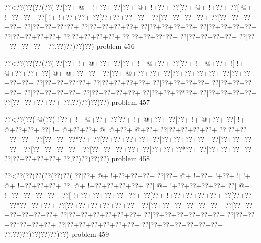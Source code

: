 \vbox{\vbox{\goo
\0??<\0??(\0??(\0??(\0??(
\0??[\0??+\- @+\- !+\0??+
\0??[\0??+\- @+\- !+\0??+
\0??[\0??+\- @+\- !+\0??+
\0??[\- @+\- !+\0??+\0??+
\0??[\- !+\- !+\0??+\0??+
\0??[\0??+\0??+\0??+\0??+
\0??[\0??+\0??+\0??+\0??+
\0??[\0??+\0??+\0??+\0??+
\0??[\0??+\0??+\0??*\0??+
\0??[\0??+\0??+\0??+\0??+
\0??[\0??+\0??+\0??+\0??+
\0??[\0??+\0??+\0??+\0??+
\0??[\0??+\0??+\0??+\0??+
\0??[\0??+\0??+\0??+\0??+
\0??[\0??+\0??+\0??*\0??+
\0??[\0??+\0??+\0??+\0??+
\0??[\0??+\0??+\0??+\0??+
\0??,\0??)\0??)\0??)\0??)
}
\hfil problem 456\hfil\break
}

\vbox{\vbox{\goo
\0??<\0??(\0??(\0??(\0??(
\0??[\0??+\- !+\- @+\0??+
\0??[\0??+\- !+\- @+\0??+
\0??[\0??+\- !+\- @+\0??+
\- ![\- !+\- @+\0??+\0??+
\0??[\- @+\- @+\0??+\0??+
\0??[\0??+\- @+\0??+\0??+
\0??[\0??+\0??+\0??+\0??+
\0??[\0??+\0??+\0??+\0??+
\0??[\0??+\0??+\0??*\0??+
\0??[\0??+\0??+\0??+\0??+
\0??[\0??+\0??+\0??+\0??+
\0??[\0??+\0??+\0??+\0??+
\0??[\0??+\0??+\0??+\0??+
\0??[\0??+\0??+\0??+\0??+
\0??[\0??+\0??+\0??*\0??+
\0??[\0??+\0??+\0??+\0??+
\0??[\0??+\0??+\0??+\0??+
\0??,\0??)\0??)\0??)\0??)
}
\hfil problem 457\hfil\break
}

\vbox{\vbox{\goo
\0??<\0??(\0??(\- @(\0??(
\- ![\0??+\- !+\- @+\0??+
\0??[\0??+\- !+\- @+\0??+
\0??[\0??+\- !+\- @+\0??+
\0??[\- !+\- @+\0??+\0??+
\0??[\- !+\- @+\0??+\0??+
\- @[\- @+\0??+\- @+\0??+
\0??[\0??+\0??+\0??+\0??+
\0??[\0??+\0??+\0??+\0??+
\0??[\0??+\0??+\0??*\0??+
\0??[\0??+\0??+\0??+\0??+
\0??[\0??+\0??+\0??+\0??+
\0??[\0??+\0??+\0??+\0??+
\0??[\0??+\0??+\0??+\0??+
\0??[\0??+\0??+\0??+\0??+
\0??[\0??+\0??+\0??*\0??+
\0??[\0??+\0??+\0??+\0??+
\0??[\0??+\0??+\0??+\0??+
\0??,\0??)\0??)\0??)\0??)
}
\hfil problem 458\hfil\break
}

\vbox{\vbox{\goo
\0??<\0??(\0??(\0??(\0??(\0??(\0??(
\0??[\0??+\- @+\- !+\0??+\0??+\0??+
\0??[\0??+\- @+\- !+\0??+\- !+\0??+
\- ![\- !+\- @+\- !+\0??+\0??+\0??+
\0??[\- @+\- !+\0??+\0??+\0??+\0??+
\0??[\- @+\- !+\0??+\0??+\0??+\0??+
\0??[\- @+\- !+\0??+\0??+\0??+\0??+
\0??[\- !+\0??+\0??+\0??+\0??+\0??+
\0??[\0??+\- !+\0??+\0??+\0??+\0??+
\0??[\0??+\0??+\0??*\0??+\0??+\0??+
\0??[\0??+\0??+\0??+\0??+\0??+\0??+
\0??[\0??+\0??+\0??+\0??+\0??+\0??+
\0??[\0??+\0??+\0??+\0??+\0??+\0??+
\0??[\0??+\0??+\0??+\0??+\0??+\0??+
\0??[\0??+\0??+\0??+\0??+\0??+\0??+
\0??[\0??+\0??+\0??*\0??+\0??+\0??+
\0??[\0??+\0??+\0??+\0??+\0??+\0??+
\0??[\0??+\0??+\0??+\0??+\0??+\0??+
\0??,\0??)\0??)\0??)\0??)\0??)\0??)
}
\hfil problem 459\hfil\break
}

